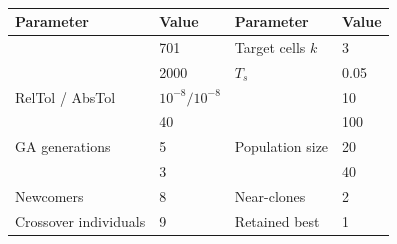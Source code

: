 \begin{table}[htbp]
\centering\small
\caption[Habib-based transferred settings for Experiments A and B]{}
\label{tab:baseline}
\begingroup{}
\setlength{\tabcolsep}{3.5pt}
\begin{tabularx}{\linewidth}{@{}Y l Y l@{}}
\toprule
Parameter & Value & Parameter & Value \\
\midrule
{} & 701 & Target cells $k$ & 3 \\
 & 2000 & $T_s$ & 0.05 \\
RelTol / AbsTol & $10^{-8}/10^{-8}$ &  & 10 \\
 & 40 &  & 100 \\
GA generations & 5 & Population size & 20 \\
 & 3 &  & 40 \\
Newcomers & 8 & Near-clones & 2 \\
Crossover individuals & 9 & Retained best & 1 \\
\bottomrule
\end{tabularx}\endgroup
\end{table}
